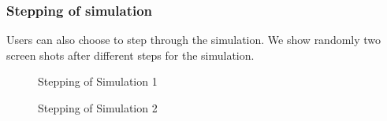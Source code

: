 \documentclass{article}
\begin{document}
\begin{normalsize}
\newpage
\subsubsection{Stepping of simulation}
Users can also choose to step through the simulation. We show randomly two screen shots after different steps for the simulation.
\begin{figure}[H]
	\caption{Stepping of Simulation 1}
\end{figure}

\begin{figure}[H]
	\caption{Stepping of Simulation 2}
\end{figure}


\end{normalsize}
\end{document}

